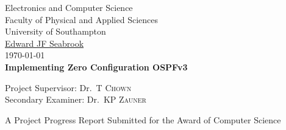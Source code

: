 
\begin{titlepage}

\begin{center}



\LARGE Electronics and Computer Science\\
Faculty of Physical and Applied Sciences\\
University of Southampton
\\[1.5cm]

\href{mailto:ejfs1g10@ecs.soton.ac.uk}{Edward JF Seabrook}\\[0.5cm]

\today \\[1cm]
{\bfseries Implementing Zero Configuration OSPFv3}\\[1.5cm]

\vfill

\large
Project Supervisor: 
Dr.~T \textsc{Chown}\\

\large
Secondary Examiner:
Dr.~KP \textsc{Zauner} 

\vfill

A Project Progress Report Submitted for the Award of Computer Science

\end{center}

\end{titlepage}
